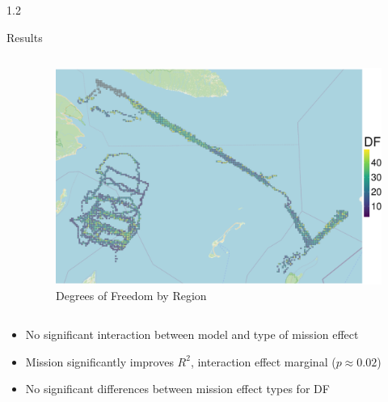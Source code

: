 \documentclass[final]{beamer}
\newlength{\colwidth}
\begin{document}
\begin{frame}[t]
\begin{columns}[t]
\begin{column}{1.2\colwidth}
\begin{block}{Results}
\begin{columns}[t]
\begin{column}{0.48 \textwidth}
          
      \end{column}

      \begin{column}{0.48 \textwidth}
    \vspace{-20pt}
    \begin{flushright}
        
        \begin{figure}
          \includegraphics[width= \textwidth]{Figures/EDF Map.pdf}  
      \vspace{-55pt}
          \caption{Degrees of Freedom by Region}
        \end{figure}      
    \end{flushright}
        \end{column}
  \end{columns}

    \vspace{-50pt}
      \vspace{-20pt}
        \begin{itemize}
            \item No significant interaction between model and type of mission effect
            \item Mission significantly improves $R^2$, interaction effect marginal ($p \approx 0.02$)
            \item No significant differences between mission effect types for DF
        \end{itemize}

    \vspace{-10pt}
    

\end{block}
\end{column}
\end{columns}
\end{frame}
\end{document}
